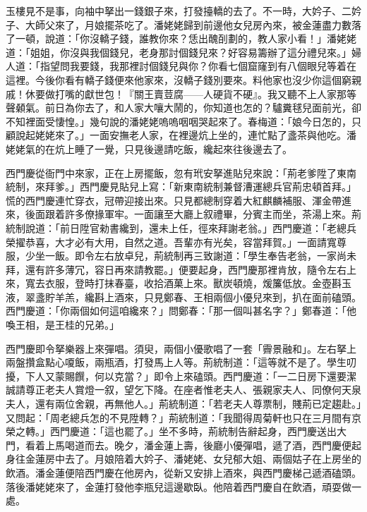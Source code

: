 玉樓見不是事，向袖中拏出一錢銀子來，打發擡轎的去了。不一時，大妗子、二妗子、大師父來了，月娘擺茶吃了。潘姥姥歸到前邊他女兒房內來，被金蓮盡力數落了一頓，說道：「你沒轎子錢，誰教你來？恁出醜㓦劃的，教人家小看！」潘姥姥道：「姐姐，你沒與我個錢兒，老身那討個錢兒來？好容易籌辦了這分禮兒來。」婦人道：「指望問我要錢，我那裡討個錢兒與你？你看七個窟窿到有八個眼兒等着在這裡。今後你看有轎子錢便來他家來，沒轎子錢別要來。料他家也沒少你這個窮親戚！休要做打嘴的獻世包！『關王賣荳腐——人硬貨不硬』。我又聽不上人家那等𣭈聲顙氣。前日為你去了，和人家大嚷大鬧的，{}你知道也怎的？驢糞毬兒面前光，卻不知裡面受悽惶。」幾句說的潘姥姥嗚嗚咽咽哭起來了。春梅道：「娘今日怎的，只顧說起姥姥來了。」一面安撫老人家，在裡邊炕上坐的，連忙點了盞茶與他吃。潘姥姥氣的在炕上睡了一覺，只見後邊請吃飯，纔起來往後邊去了。

西門慶從衙門中來家，正在上房擺飯，忽有玳安拏進貼兒來說：「荊老爹陞了東南統制，來拜爹。」西門慶見貼兒上寫：「新東南統制兼督漕運總兵官荊忠頓首拜。」慌的西門慶連忙穿衣，冠帶迎接出來。只見都總制穿着大紅麒麟補服、渾金帶進來，後面跟着許多僚掾軍牢。一面讓至大廳上叙禮畢，分賓主而坐，茶湯上來。荊統制說道：「前日陞官勑書纔到，還未上任，徑來拜謝老翁。」西門慶道：「老總兵榮擢恭喜，大才必有大用，自然之道。吾輩亦有光矣，容當拜賀。」一面請寬尊服，少坐一飯。即令左右放卓兒，荊統制再三致謝道：「學生奉告老翁，一家尚未拜，還有許多薄冗，容日再來請教罷。」便要起身，西門慶那裡肯放，隨令左右上來，寬去衣服，登時打抹春臺，收拾酒菓上來。獸炭頓燒，煖簾低放。金壺斟玉液，翠盞貯羊羔，纔斟上酒來，只見鄭春、王相兩個小優兒來到，扒在面前磕頭。西門慶道：「你兩個如何這咱纔來？」問鄭春：「那一個叫甚名字？」鄭春道：「他喚王相，是王桂的兄弟。」

西門慶即令拏樂器上來彈唱。須臾，兩個小優歌唱了一套「霽景融和」。左右拏上兩盤攢盒點心嗄飯，兩瓶酒，打發馬上人等。荊統制道：「這等就不是了。學生叨擾，下人又蒙賜饌，何以克當？」即令上來磕頭。西門慶道：「一二日房下還要潔誠請尊正老夫人賞燈一叙，望乞下降。在座者惟老夫人、張親家夫人、同僚何天泉夫人，還有兩位舍親，再無他人。」荊統制道：「若老夫人尊票制，賤荊已定趨赴。」又問起：「周老總兵怎的不見陞轉？」荊統制道：「我聞得周菊軒也只在三月間有京榮之轉。」西門慶道：「這也罷了。」坐不多時，荊統制告辭起身，西門慶送出大門，看着上馬喝道而去。晚夕，潘金蓮上壽，後廳小優彈唱，遞了酒，西門慶便起身往金蓮房中去了。月娘陪着大妗子、潘姥姥、女兒郁大姐、兩個姑子在上房坐的飲酒。潘金蓮便陪西門慶在他房內，從新又安排上酒來，與西門慶梯己遞酒磕頭。{}落後潘姥姥來了，金蓮打發他李瓶兒這邊歇臥。他陪着西門慶自在飲酒，頑耍做一處。

